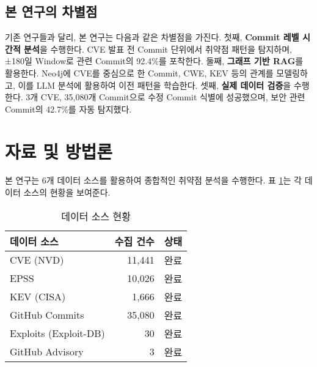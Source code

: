 ﻿\documentclass[conference]{IEEEtran}
\begin{document}
\subsection{본 연구의 차별점}

기존 연구들과 달리, 본 연구는 다음과 같은 차별점을 가진다. 첫째, \textbf{Commit 레벨 시간적 분석}을 수행한다. CVE 발표 전 Commit 단위에서 취약점 패턴을 탐지하며, ±180일 Window로 관련 Commit의 92.4\%를 포착한다. 둘째, \textbf{그래프 기반 RAG}를 활용한다. Neo4j에 CVE를 중심으로 한 Commit, CWE, KEV 등의 관계를 모델링하고, 이를 LLM 분석에 활용하여 이전 패턴을 학습한다. 셋째, \textbf{실제 데이터 검증}을 수행한다. 3개 CVE, 35,080개 Commit으로 수정 Commit 식별에 성공했으며, 보안 관련 Commit의 42.7\%를 자동 탐지했다.


\section{자료 및 방법론}

본 연구는 6개 데이터 소스를 활용하여 종합적인 취약점 분석을 수행한다. 표 \ref{tab:data_sources}는 각 데이터 소스의 현황을 보여준다.

\begin{table}[h]
\centering
\caption{데이터 소스 현황}
\label{tab:data_sources}
\begin{tabular}{lrr}
\toprule
\textbf{데이터 소스} & \textbf{수집 건수} & \textbf{상태} \\
\midrule
CVE (NVD) & 11,441 & 완료 \\
EPSS & 10,026 & 완료 \\
KEV (CISA) & 1,666 & 완료 \\
GitHub Commits & 35,080 & 완료 \\
Exploits (Exploit-DB) & 30 & 완료 \\
GitHub Advisory & 3 & 완료 \\
\bottomrule
\end{tabular}
\end{table}
\end{document}
